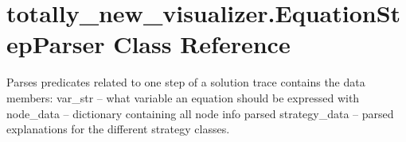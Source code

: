 \hypertarget{classtotally__new__visualizer_1_1_equation_step_parser}{}\section{totally\+\_\+new\+\_\+visualizer.\+Equation\+Step\+Parser Class Reference}
\label{classtotally__new__visualizer_1_1_equation_step_parser}


Parses predicates related to one step of a solution trace contains the data members\+: var\+\_\+str -- what variable an equation should be expressed with node\+\_\+data -- dictionary containing all node info parsed strategy\+\_\+data -- parsed explanations for the different strategy classes.  


